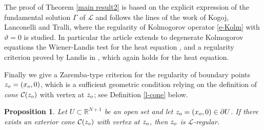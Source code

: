\documentclass{amsart}
\newtheorem{prop}[thm]{Proposition}
\numberwithin{equation}{section}
\def \Lc{{\mathcal{L}}}
\def \r{{\mathbb{R}}}
\renewcommand{\Gamma}{\varGamma}
\begin{document}
The proof of Theorem \ref{main result2} is based on the explicit expression of the fundamental solution $\Gamma$ of $\Lc$ and follows the lines of the work \cite{KLT18} of {Kogoj, Lanconelli and Tralli}, where the regularity of Kolmogorov operator \eqref{e-Kolm} with $\vartheta=0$ is studied. In particular the article \cite{KLT18} extends to degenerate Kolmogorov equations the 
Wiener-Landis test
for the heat equation \cite{EG82}, and a regularity criterion proved by {Landis} in \cite{Lan69}, which again holds for the heat equation.

Finally we give a Zaremba-type criterion for the regularity of boundary points $z_{\rm o} =(x_{\rm o}, 0)$, which is a sufficient geometric condition relying on the definition of \textit{cone} $\mathcal{C}({z_{\rm o}})$ with vertex at $z_{\rm o}$; see Definition \ref{l-cone} {below}. 
\begin{prop}
	\label{main result3}
	Let $U \subset \r^{N+1}$ be an open set and let $z_{\rm o}=(x_{\rm o},0) \in \partial U$. If there exists an exterior cone $\mathcal{C}({z_{\rm o}})$ with vertex at $z_{\rm o}$, then $z_{\rm o}$ is $\Lc$-regular.
\end{prop}
\end{document}
